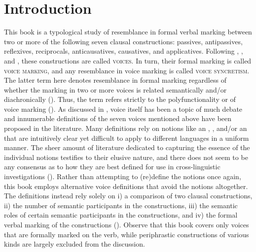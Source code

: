 \chapter{Introduction} \label{introduction}
This book is a typological study of resemblance in formal verbal marking between two or more of the following seven clausal constructions: passives, antipassives, reflexives, reciprocals, anticausatives, causatives, and applicatives. Following \citet{malchukov:2015, malchukov:2016, malchukov:2017}, \citet{creissels:2016}, and \citet{zuniga:kittila:2019}, these constructions are called \textsc{voices}. In turn, their formal marking is called \textsc{voice marking}, and any resemblance in voice marking is called \textsc{voice syncretism}. The latter term here denotes resemblance in formal marking regardless of whether the marking in two or more voices is related semantically and/or diachronically (\citealt[233f.]{zuniga:kittila:2019}). Thus, the term refers strictly to the polyfunctionality or  of voice marking (\citealt[21]{haspelmath:2019}). As discussed in , voice itself has been a topic of much debate and innumerable definitions of the seven voices mentioned above have been proposed in the literature. Many definitions rely on notions like an , ,  and/or an  that are intuitively clear yet difficult to apply to different languages in a uniform manner. The sheer amount of literature dedicated to capturing the essence of the individual notions testifies to their elusive nature, and there does not seem to be any consensus as to how they are best defined for use in cross-linguistic investigations (). Rather than attempting to (re)define the notions once again, this book employs alternative voice definitions that avoid the notions altogether. The definitions instead rely solely on i) a comparison of two clausal constructions, ii) the number of semantic participants in the constructions, iii) the semantic roles of certain semantic participants in the constructions, and iv) the formal verbal marking of the constructions (). Observe that this book covers only voices that are formally marked on the verb, while periphrastic constructions of various kinds are largely excluded from the discussion.

